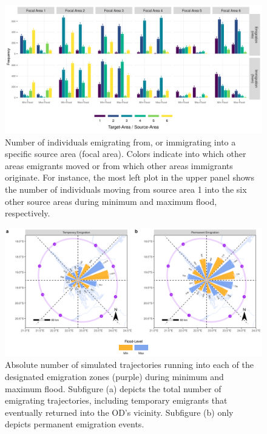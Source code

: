 \documentclass[abstract=on,10pt,a4paper,bibliography=totocnumbered]{article}
\begin{document}
\begin{figure}
 \begin{center}
  \includegraphics[width = \textwidth]{99_ImmigrationEmigration.png}
  \caption{Number of individuals emigrating from, or immigrating into a specific
  source area (focal area). Colors indicate into which other areas emigrants
  moved or from which other areas immigrants originate. For instance, the most
  left plot in the upper panel shows the number of individuals moving from
  source area 1 into the six other source areas during minimum and maximum
  flood, respectively.}
  \label{EmigrationImmigration}
 \end{center}
\end{figure}

\begin{figure}
  \begin{center}
  \includegraphics[width = \textwidth]{99_Emigration.png}
  \caption{Absolute number of simulated trajectories running into each of the
  designated emigration zones (purple) during minimum and maximum flood.
  Subfigure (a) depicts the total number of emigrating trajectories, including
  temporary emigrants that eventually returned into the OD's vicinity. Subfigure
  (b) only depicts permanent emigration events.}
  \label{Emigration}
  \end{center}
\end{figure}
\end{document}
